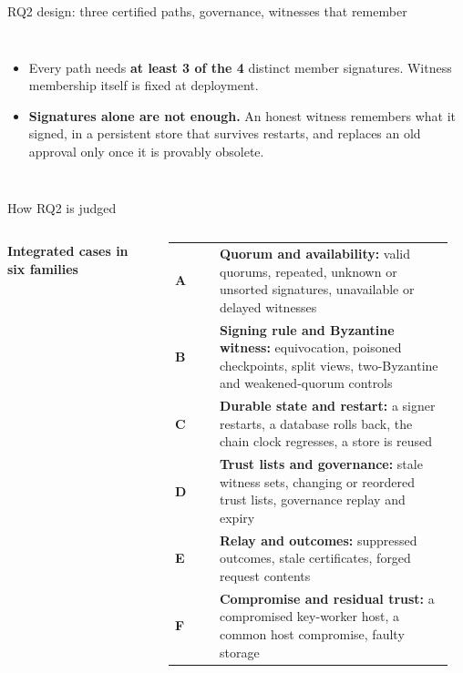 \documentclass[aspectratio=169,10pt]{beamer}
\begin{document}
\begin{frame}{RQ2 design: three certified paths, governance, witnesses that remember}
\begin{columns}[T,onlytextwidth]
\vspace{0.5em}
\begin{itemize}\scriptsize\setlength{\itemsep}{2pt}
  \item Every path needs \textbf{at least 3 of the 4} distinct member signatures. Witness membership itself is fixed at deployment.
  \item \textbf{Signatures alone are not enough.} An honest witness remembers what it signed, in a persistent store that survives restarts, and replaces an old approval only once it is provably obsolete.
\end{itemize}
\end{columns}
\end{frame}

\begin{frame}{How RQ2 is judged}
\begin{columns}[T,onlytextwidth]
\footnotesize\textbf{Integrated cases in six families}\\[0.3em]
\scriptsize
\renewcommand{\arraystretch}{1.25}
\begin{tabular}{@{}l L{0.84\linewidth}@{}}
\textbf{A} & \textbf{Quorum and availability:} valid quorums, repeated, unknown or unsorted signatures, unavailable or delayed witnesses \\
\textbf{B} & \textbf{Signing rule and Byzantine witness:} equivocation, poisoned checkpoints, split views, two-Byzantine and weakened-quorum controls \\
\textbf{C} & \textbf{Durable state and restart:} a signer restarts, a database rolls back, the chain clock regresses, a store is reused \\
\textbf{D} & \textbf{Trust lists and governance:} stale witness sets, changing or reordered trust lists, governance replay and expiry \\
\textbf{E} & \textbf{Relay and outcomes:} suppressed outcomes, stale certificates, forged request contents \\
\textbf{F} & \textbf{Compromise and residual trust:} a compromised key-worker host, a common host compromise, faulty storage \\
\end{tabular}\\[0.3em]


\end{columns}
\end{frame}
\end{document}
